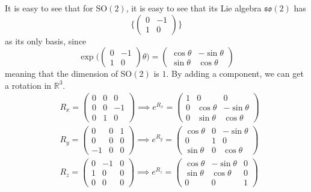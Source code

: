   It is easy to see that for SO$(2)$, it is easy to see that its Lie algebra $\mathfrak{so}(2)$ has 
  \begin{equation}
    \bigg\{ \begin{pmatrix}
    0&-1\\1&0
    \end{pmatrix}\bigg\}
  \end{equation}
  as its only basis, since 
  \begin{equation}
    \exp  \bigg( \begin{pmatrix}
    0&-1\\1&0
    \end{pmatrix} \theta \bigg) = \begin{pmatrix}
    \cos{\theta} & - \sin{\theta} \\
    \sin{\theta} & \cos{\theta}
    \end{pmatrix}
  \end{equation}
  meaning that the dimension of SO$(2)$ is $1$. By adding a component, we can get a rotation in $\mathbb{R}^3$. 
  \begin{align*}
    & R_x = \begin{pmatrix}0&0&0\\0&0&-1\\0&1&0\end{pmatrix} \implies e^{R_x} = \begin{pmatrix}
    1&0&0\\ 0&\cos{\theta}&-\sin{\theta}\\0&\sin{\theta}&\cos{\theta}
    \end{pmatrix}\\
    & R_y = \begin{pmatrix}0&0&1\\0&0&0\\-1&0&0\end{pmatrix} \implies e^{R_y} = \begin{pmatrix}
    \cos{\theta} & 0 & -\sin{\theta}\\ 0&1&0 \\
    \sin{\theta}& 0 & \cos{\theta} \end{pmatrix} \\
    & R_z = \begin{pmatrix}0&-1&0\\1&0&0\\0&0&0\end{pmatrix} \implies e^{R_z} = \begin{pmatrix}
    \cos{\theta} & -\sin{\theta} & 0\\
    \sin{\theta}& \cos{\theta} & 0 \\ 0 & 0 & 1\end{pmatrix}
  \end{align*}
